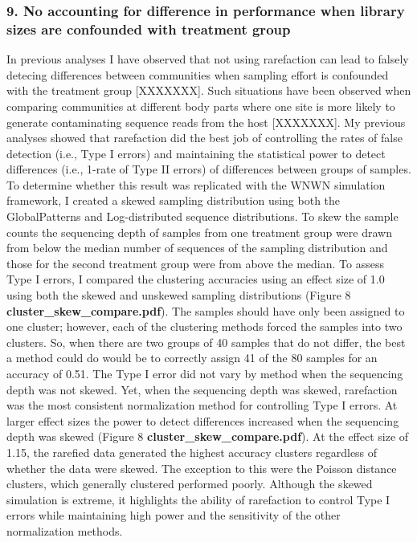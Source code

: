 \documentclass[
]{article}
\begin{document}
\hypertarget{no-accounting-for-difference-in-performance-when-library-sizes-are-confounded-with-treatment-group}{%
\subsubsection{9. No accounting for difference in performance when
library sizes are confounded with treatment
group}\label{no-accounting-for-difference-in-performance-when-library-sizes-are-confounded-with-treatment-group}}

In previous analyses I have observed that not using rarefaction can lead
to falsely detecing differences between communities when sampling effort
is confounded with the treatment group {[}XXXXXXX{]}. Such situations
have been observed when comparing communities at different body parts
where one site is more likely to generate contaminating sequence reads
from the host {[}XXXXXXX{]}. My previous analyses showed that
rarefaction did the best job of controlling the rates of false detection
(i.e., Type I errors) and maintaining the statistical power to detect
differences (i.e., 1-rate of Type II errors) of differences between
groups of samples. To determine whether this result was replicated with
the WNWN simulation framework, I created a skewed sampling distribution
using both the GlobalPatterns and Log-distributed sequence
distributions. To skew the sample counts the sequencing depth of samples
from one treatment group were drawn from below the median number of
sequences of the sampling distribution and those for the second
treatment group were from above the median. To assess Type I errors, I
compared the clustering accuracies using an effect size of 1.0 using
both the skewed and unskewed sampling distributions (Figure 8
\textbf{cluster\_skew\_compare.pdf}). The samples should have only been
assigned to one cluster; however, each of the clustering methods forced
the samples into two clusters. So, when there are two groups of 40
samples that do not differ, the best a method could do would be to
correctly assign 41 of the 80 samples for an accuracy of 0.51. The Type
I error did not vary by method when the sequencing depth was not skewed.
Yet, when the sequencing depth was skewed, rarefaction was the most
consistent normalization method for controlling Type I errors. At larger
effect sizes the power to detect differences increased when the
sequencing depth was skewed (Figure 8
\textbf{cluster\_skew\_compare.pdf}). At the effect size of 1.15, the
rarefied data generated the highest accuracy clusters regardless of
whether the data were skewed. The exception to this were the Poisson
distance clusters, which generally clustered performed poorly. Although
the skewed simulation is extreme, it highlights the ability of
rarefaction to control Type I errors while maintaining high power and
the sensitivity of the other normalization methods.
\end{document}
